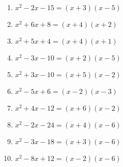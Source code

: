 \documentclass{ximera}
\begin{document}
\begin{enumerate}
  \item $x^2 - 2x - 15 = (x + 3)(x - 5)$
  \item $x^2 + 6x + 8 = (x + 4)(x + 2)$
  \item $x^2 + 5x + 4 = (x + 4)(x + 1)$
  \item $x^2 - 3x - 10 = (x + 2)(x - 5)$
  \item $x^2 + 3x - 10 = (x + 5)(x - 2)$
  \item $x^2 - 5x + 6 = (x - 2)(x - 3)$
  \item $x^2 + 4x - 12 = (x + 6)(x - 2)$
  \item $x^2 - 2x - 24 = (x + 4)(x - 6)$
  \item $x^2 - 3x - 18 = (x + 3)(x - 6)$
  \item $x^2 - 8x + 12 = (x - 2)(x - 6)$
\end{enumerate}
\end{document}
